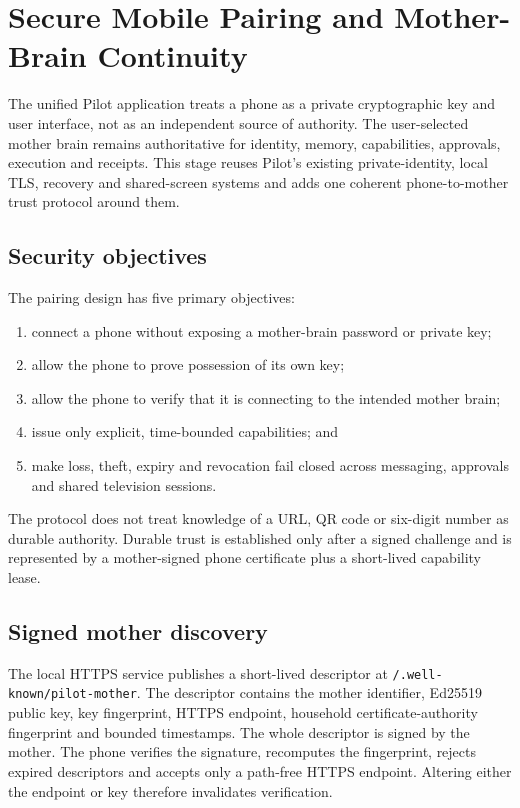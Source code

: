 \section{Secure Mobile Pairing and Mother-Brain Continuity}

The unified Pilot application treats a phone as a private cryptographic key and user interface,
not as an independent source of authority.  The user-selected mother brain remains authoritative
for identity, memory, capabilities, approvals, execution and receipts.  This stage reuses Pilot's
existing private-identity, local TLS, recovery and shared-screen systems and adds one coherent
phone-to-mother trust protocol around them.

\subsection{Security objectives}

The pairing design has five primary objectives:
\begin{enumerate}
  \item connect a phone without exposing a mother-brain password or private key;
  \item allow the phone to prove possession of its own key;
  \item allow the phone to verify that it is connecting to the intended mother brain;
  \item issue only explicit, time-bounded capabilities; and
  \item make loss, theft, expiry and revocation fail closed across messaging, approvals and shared
  television sessions.
\end{enumerate}

The protocol does not treat knowledge of a URL, QR code or six-digit number as durable authority.
Durable trust is established only after a signed challenge and is represented by a mother-signed
phone certificate plus a short-lived capability lease.

\subsection{Signed mother discovery}

The local HTTPS service publishes a short-lived descriptor at
\texttt{/.well-known/pilot-mother}.  The descriptor contains the mother identifier, Ed25519 public
key, key fingerprint, HTTPS endpoint, household certificate-authority fingerprint and bounded
timestamps.  The whole descriptor is signed by the mother.  The phone verifies the signature,
recomputes the fingerprint, rejects expired descriptors and accepts only a path-free HTTPS
endpoint.  Altering either the endpoint or key therefore invalidates verification.

